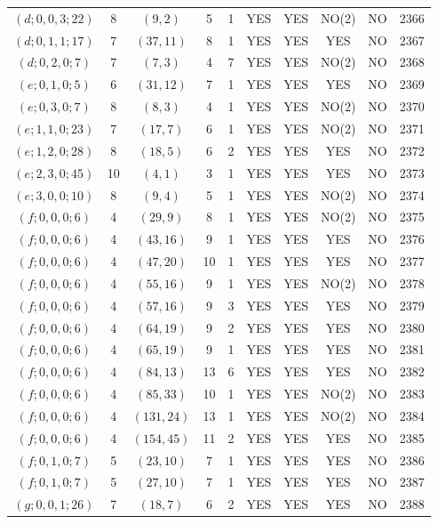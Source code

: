 \begin{longtable}{|c|c|c|c|c|c|c|c|c|c|}
$(d; 0, 0, 3; 22)$ & 8 & $(9, 2)$ & 5 & 1 & YES & YES & NO(2) & NO & 2366\\
$(d; 0, 1, 1; 17)$ & 7 & $(37, 11)$ & 8 & 1 & YES & YES & YES & NO & 2367\\
$(d; 0, 2, 0; 7)$ & 7 & $(7, 3)$ & 4 & 7 & YES & YES & NO(2) & NO & 2368\\
$(e; 0, 1, 0; 5)$ & 6 & $(31, 12)$ & 7 & 1 & YES & YES & YES & NO & 2369\\
$(e; 0, 3, 0; 7)$ & 8 & $(8, 3)$ & 4 & 1 & YES & YES & NO(2) & NO & 2370\\
$(e; 1, 1, 0; 23)$ & 7 & $(17, 7)$ & 6 & 1 & YES & YES & NO(2) & NO & 2371\\
$(e; 1, 2, 0; 28)$ & 8 & $(18, 5)$ & 6 & 2 & YES & YES & YES & NO & 2372\\
$(e; 2, 3, 0; 45)$ & 10 & $(4, 1)$ & 3 & 1 & YES & YES & YES & NO & 2373\\
$(e; 3, 0, 0; 10)$ & 8 & $(9, 4)$ & 5 & 1 & YES & YES & NO(2) & NO & 2374\\
$(f; 0, 0, 0; 6)$ & 4 & $(29, 9)$ & 8 & 1 & YES & YES & NO(2) & NO & 2375\\
$(f; 0, 0, 0; 6)$ & 4 & $(43, 16)$ & 9 & 1 & YES & YES & YES & NO & 2376\\
$(f; 0, 0, 0; 6)$ & 4 & $(47, 20)$ & 10 & 1 & YES & YES & YES & NO & 2377\\
$(f; 0, 0, 0; 6)$ & 4 & $(55, 16)$ & 9 & 1 & YES & YES & NO(2) & NO & 2378\\
$(f; 0, 0, 0; 6)$ & 4 & $(57, 16)$ & 9 & 3 & YES & YES & YES & NO & 2379\\
$(f; 0, 0, 0; 6)$ & 4 & $(64, 19)$ & 9 & 2 & YES & YES & YES & NO & 2380\\
$(f; 0, 0, 0; 6)$ & 4 & $(65, 19)$ & 9 & 1 & YES & YES & YES & NO & 2381\\
$(f; 0, 0, 0; 6)$ & 4 & $(84, 13)$ & 13 & 6 & YES & YES & YES & NO & 2382\\
$(f; 0, 0, 0; 6)$ & 4 & $(85, 33)$ & 10 & 1 & YES & YES & NO(2) & NO & 2383\\
$(f; 0, 0, 0; 6)$ & 4 & $(131, 24)$ & 13 & 1 & YES & YES & NO(2) & NO & 2384\\
$(f; 0, 0, 0; 6)$ & 4 & $(154, 45)$ & 11 & 2 & YES & YES & YES & NO & 2385\\
$(f; 0, 1, 0; 7)$ & 5 & $(23, 10)$ & 7 & 1 & YES & YES & YES & NO & 2386\\
$(f; 0, 1, 0; 7)$ & 5 & $(27, 10)$ & 7 & 1 & YES & YES & YES & NO & 2387\\
$(g; 0, 0, 1; 26)$ & 7 & $(18, 7)$ & 6 & 2 & YES & YES & YES & NO & 2388\\

\end{longtable}
